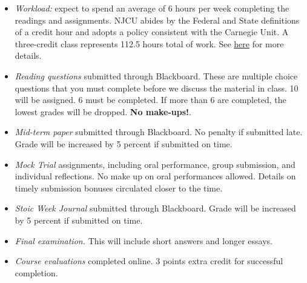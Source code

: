 \documentclass[article,oneside]{memoir}
\begin{document}
\begin{itemize}


\item \textit{Workload:} expect to spend an average of 6 hours per week completing the readings and assignments. NJCU abides by the Federal and State definitions of a credit hour and adopts a policy consistent with the Carnegie Unit. A three-credit class represents 112.5 hours total of work. See \href{http://scottoconnor.org/resources/Credit.pdf}{here} for more details.




\item \textit{Reading questions} submitted through Blackboard. These are multiple choice questions that you must complete before we discuss the material in class. 10 will be assigned. 6 must be completed. If more than 6 are completed, the lowest grades will be dropped. \textbf{No make-ups!}.



\item \textit{Mid-term paper} submitted through Blackboard. No penalty if submitted late. Grade will be increased by 5 percent if submitted on time.

\item \textit{Mock Trial} assignments, including oral performance, group submission, and individual reflections. No make up on oral performances allowed. Details on timely submission bonuses circulated closer to the time.

\item \textit{Stoic Week Journal} submitted through Blackboard. Grade will be increased by 5 percent if submitted on time. 


\item \textit{Final examination.} This will include short answers and longer essays.  

\item \textit{Course evaluations} completed online. 3 points extra credit for successful completion.


\end{itemize}
\end{document}
